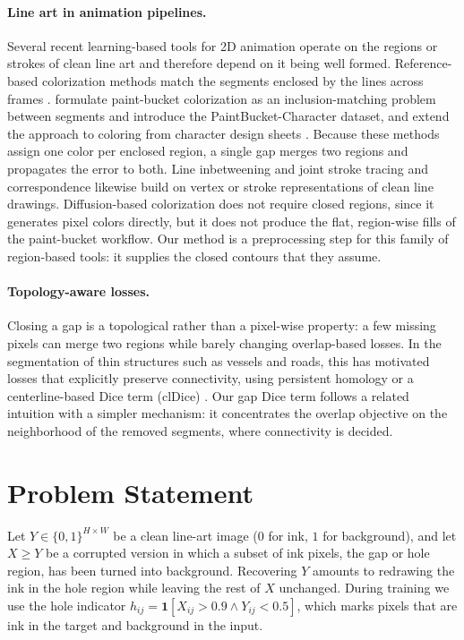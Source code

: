 \documentclass[preprint,12pt]{elsarticle}
\begin{document}
\paragraph{Line art in animation pipelines.} 
Several recent learning-based tools for 2D animation operate on the regions or
strokes of clean line art and therefore depend on it being well formed.
Reference-based colorization methods match the segments enclosed by the lines
across frames \citep{casey2021animation}. \citet{dai2024inclusion} formulate
paint-bucket colorization as an inclusion-matching problem between segments and
introduce the PaintBucket-Character dataset, and extend the approach to coloring
from character design sheets \citep{dai2024designsheets}. Because these methods
assign one color per enclosed region, a single gap merges two regions and propagates
the error to both. Line inbetweening \citep{siyao2023inbetween} and joint stroke
tracing and correspondence \citep{mo2024jostc} likewise build on vertex or stroke
representations of clean line drawings. Diffusion-based colorization
\citep{liu2025manganinja} does not require closed regions, since it generates
pixel colors directly, but it does not produce the flat, region-wise fills of the
paint-bucket workflow. Our method is a preprocessing step for this family of
region-based tools: it supplies the closed contours that they assume.

\paragraph{Topology-aware losses.}
Closing a gap is a topological rather than a pixel-wise property: a few missing
pixels can merge two regions while barely changing overlap-based losses. In the
segmentation of thin structures such as vessels and roads, this has motivated
losses that explicitly preserve connectivity, using persistent homology
\citep{hu2019topology} or a centerline-based Dice term (clDice)
\citep{shit2021cldice}. Our gap Dice term follows a related intuition with a
simpler mechanism: it concentrates the overlap objective on the neighborhood of the
removed segments, where connectivity is decided.

\section{Problem Statement}  
\label{sec:problem}

Let $Y \in \{0,1\}^{H \times W}$ be a clean line-art image ($0$ for ink, $1$ for
background), and let $X \ge Y$ be a corrupted version in which a subset of ink
pixels, the gap or hole region, has been turned into background. Recovering $Y$
amounts to redrawing the ink in the hole region while leaving the rest of $X$ unchanged. During training we use the hole indicator $h_{ij} = \mathbf{1}[X_{ij} > 0.9 \wedge Y_{ij} < 0.5]$, which marks pixels that are ink in the target and background in the input.
\end{document}
